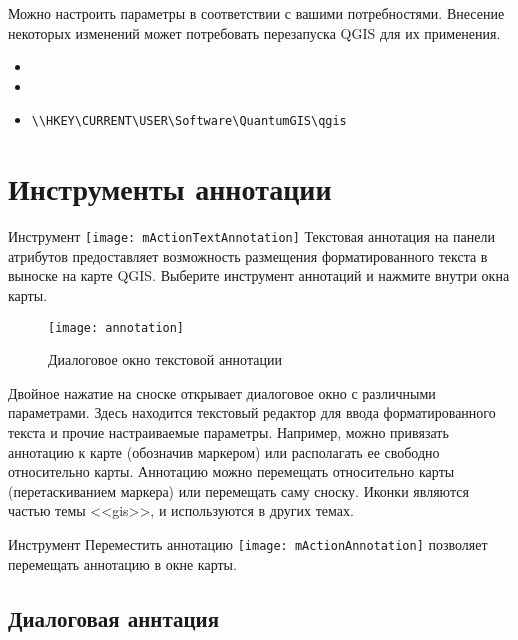 Можно настроить параметры в соответствии с вашими потребностями. Внесение
некоторых изменений может потребовать перезапуска QGIS для их применения.

\begin{itemize}
\item {}
\item {}
\item {}
\begin{verbatim}
\\HKEY\CURRENT\USER\Software\QuantumGIS\qgis
\end{verbatim}
\end{itemize}

\section{Инструменты аннотации}\label{sec:annotations}

Инструмент \texttt{[image: mActionTextAnnotation]}
Текстовая аннотация на панели атрибутов предоставляет возможность размещения
форматированного текста в выноске на карте QGIS. Выберите инструмент аннотаций
и нажмите внутри окна карты.

\begin{figure}[ht]
   \centering
   \texttt{[image: annotation]}
   \caption{Диалоговое окно текстовой аннотации \wincaption}
   \label{fig:annotation}
\end{figure}

Двойное нажатие на сноске открывает диалоговое окно с различными параметрами.
Здесь находится текстовый редактор для ввода форматированного текста и прочие
настраиваемые параметры. Например, можно привязать аннотацию к карте
(обозначив маркером) или располагать ее свободно относительно карты. Аннотацию
можно перемещать относительно карты (перетаскиванием маркера) или перемещать
саму сноску. Иконки являются частью темы <<gis>>, и используются в других
темах.

Инструмент Переместить аннотацию
\texttt{[image: mActionAnnotation]} позволяет
перемещать аннотацию в окне карты.

\subsection{Диалоговая аннтация}

